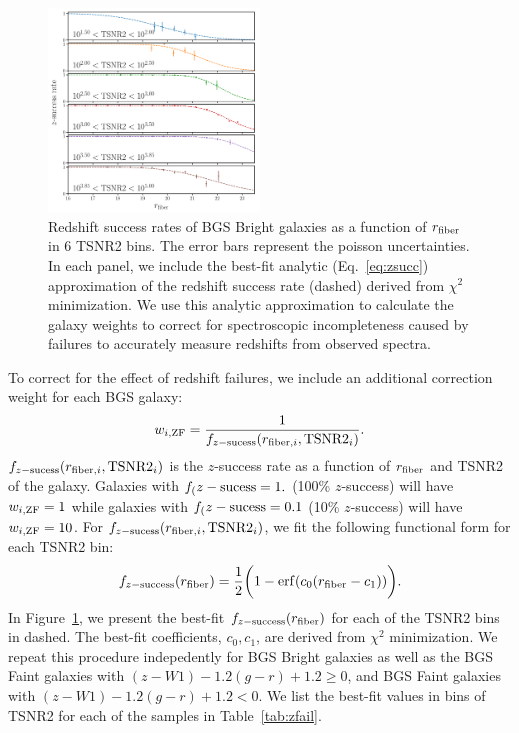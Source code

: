 \begin{figure}
\begin{center}
    \includegraphics[width=0.5\textwidth]{figs/bgs_bright_rfib_tsnr2_zsuccess.pdf}
    \caption{
        Redshift success rates of BGS Bright galaxies  as a function of 
        $r_{\rm fiber}$ in 6 TSNR2 bins. 
        The error bars represent the poisson uncertainties.
        In each panel, we include the best-fit analytic (Eq.~\ref{eq:zsucc})
        approximation of the redshift success rate (dashed) derived from
        $\chi^2$ minimization. 
        We use this analytic approximation to calculate the galaxy weights to
        correct for spectroscopic incompleteness caused by failures to
        accurately measure redshifts from observed spectra.
    }\label{fig:zfail1}
\end{center}
\end{figure}

To correct for the effect of redshift failures, we include an additional
correction weight for each BGS galaxy: 
\begin{equation}
    w_{i, {\rm ZF}} = \frac{1}{f_{z-{\rm sucess}}(r_{{\rm fiber},i}, {\rm
    TSNR2}_i)}.
\end{equation} 
$f_{z-{\rm sucess}}(r_{{\rm fiber},i}, {\rm TSNR2}_i)$ is the $z$-success rate
as a function of $r_{\rm fiber}$ and TSNR2 of the galaxy. 
Galaxies with $f_(z-{\rm sucess} = 1.$ (100\% $z$-success) will have 
$w_{i, {\rm ZF}} = 1$ while galaxies with $f_(z-{\rm sucess} = 0.1$ 
(10\% $z$-success) will have $w_{i, {\rm ZF}} = 10$.
For $f_{z-{\rm sucess}}(r_{{\rm fiber},i}, {\rm TSNR2}_i)$, we fit the
following functional form for each TSNR2 bin: 
\begin{equation} \label{eq:zsucc}
    f_{z-{\rm success}}(r_{\rm fiber}) = \frac{1}{2} \bigg(1-{\rm erf}(c_0
    (r_{\rm fiber} - c_1))\bigg).
\end{equation}
In Figure~\ref{fig:zfail1}, we present the best-fit 
$f_{z-{\rm success}}(r_{\rm fiber})$ for each of the TSNR2 bins in dashed. 
The best-fit coefficients, $c_0, c_1$, are derived from $\chi^2$ minimization.
We repeat this procedure indepedently for BGS Bright galaxies as well as the
BGS Faint galaxies with $(z - W1) - 1.2(g - r) + 1.2 \ge 0$,
and BGS Faint galaxies with $(z - W1) - 1.2(g - r) + 1.2 < 0$.
We list the best-fit values in bins of TSNR2 for each of the samples in
Table~\ref{tab:zfail}. 

